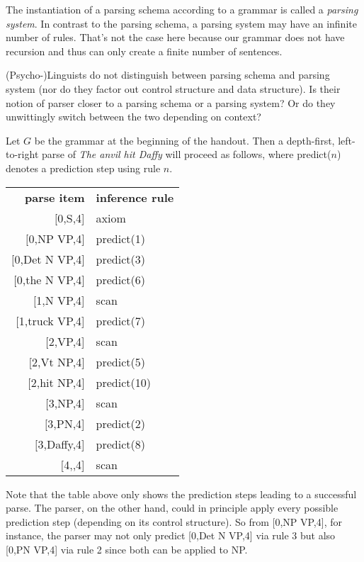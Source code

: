 \begin{prooftree}
\end{prooftree}
%
The instantiation of a parsing schema according to a grammar is called a \emph{parsing system}.
In contrast to the parsing schema, a parsing system may have an infinite number of rules.
That's not the case here because our grammar does not have recursion and thus can only create a finite number of sentences.

\begin{exercise}
    (Psycho-)Linguists do not distinguish between parsing schema and parsing system (nor do they factor out control structure and data structure).
    Is their notion of parser closer to a parsing schema or a parsing system?
    Or do they unwittingly switch between the two depending on context?
\end{exercise}

\begin{examplebox}
    Let $G$ be the grammar at the beginning of the handout.
    Then a depth-first, left-to-right parse of \emph{The anvil hit Daffy} will proceed as follows, where predict($n$) denotes a prediction step using rule $n$.
    \begin{center}
        \begin{tabular}{r|l}
            \textbf{parse item} & \textbf{inference rule}\\
            $\lbrack$0,S,4] & axiom\\
            $\lbrack$0,NP VP,4] & predict(1)\\
            $\lbrack$0,Det N VP,4] & predict(3)\\
            $\lbrack$0,the N VP,4] & predict(6)\\
            $\lbrack$1,N VP,4] & scan\\
            $\lbrack$1,truck VP,4] & predict(7)\\
            $\lbrack$2,VP,4] & scan\\
            $\lbrack$2,Vt NP,4] & predict(5)\\
            $\lbrack$2,hit NP,4] & predict(10)\\
            $\lbrack$3,NP,4] & scan\\
            $\lbrack$3,PN,4] & predict(2)\\
            $\lbrack$3,Daffy,4] & predict(8)\\
            $\lbrack$4,,4] & scan
        \end{tabular}
    \end{center}
    Note that the table above only shows the prediction steps leading to a successful parse.
    The parser, on the other hand, could in principle apply every possible prediction step (depending on its control structure).
    So from [0,NP VP,4], for instance, the parser may not only predict [0,Det N VP,4] via rule 3 but also [0,PN VP,4] via rule 2 since both can be applied to NP\@.
\end{examplebox}

